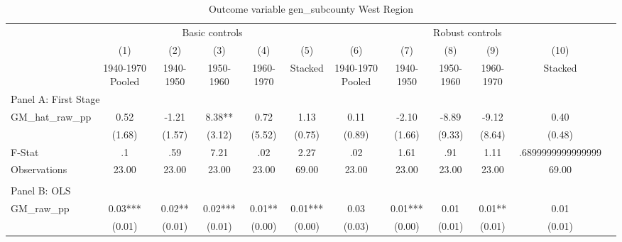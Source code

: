  \begin{table}[htbp]\centering {} \begin{threeparttable} \caption{Outcome variable gen\_subcounty West Region} \begin{tabular}{l*{11}{c}} \toprule
          &\multicolumn{5}{c}{Basic controls}                                   &\multicolumn{5}{c}{Robust controls}                                  \\\cmidrule(lr){2-6}\cmidrule(lr){7-11}
          &\multicolumn{1}{c}{(1)}&\multicolumn{1}{c}{(2)}&\multicolumn{1}{c}{(3)}&\multicolumn{1}{c}{(4)}&\multicolumn{1}{c}{(5)}&\multicolumn{1}{c}{(6)}&\multicolumn{1}{c}{(7)}&\multicolumn{1}{c}{(8)}&\multicolumn{1}{c}{(9)}&\multicolumn{1}{c}{(10)}\\
          &\multicolumn{1}{c}{1940-1970 Pooled}&\multicolumn{1}{c}{1940-1950}&\multicolumn{1}{c}{1950-1960}&\multicolumn{1}{c}{1960-1970}&\multicolumn{1}{c}{Stacked}&\multicolumn{1}{c}{1940-1970 Pooled}&\multicolumn{1}{c}{1940-1950}&\multicolumn{1}{c}{1950-1960}&\multicolumn{1}{c}{1960-1970}&\multicolumn{1}{c}{Stacked}\\
\cmidrule(lr){1-11}
\multicolumn{10}{l}{Panel A: First Stage}\\
\cmidrule(lr){1-11}
GM\_hat\_raw\_pp&      0.52   &     -1.21   &      8.38** &      0.72   &      1.13   &      0.11   &     -2.10   &     -8.89   &     -9.12   &      0.40   \\
          &    (1.68)   &    (1.57)   &    (3.12)   &    (5.52)   &    (0.75)   &    (0.89)   &    (1.66)   &    (9.33)   &    (8.64)   &    (0.48)   \\
\midrule
F-Stat    &        .1   &       .59   &      7.21   &       .02   &      2.27   &       .02   &      1.61   &       .91   &      1.11   &.6899999999999999   \\
Observations&     23.00   &     23.00   &     23.00   &     23.00   &     69.00   &     23.00   &     23.00   &     23.00   &     23.00   &     69.00   \\
\cmidrule[\heavyrulewidth](lr){1-11} \\ \cmidrule[\heavyrulewidth](lr){1-11}
\multicolumn{10}{l}{Panel B: OLS}\\
\cmidrule(lr){1-11}
GM\_raw\_pp &      0.03***&      0.02** &      0.02***&      0.01** &      0.01***&      0.03   &      0.01***&      0.01   &      0.01** &      0.01   \\
          &    (0.01)   &    (0.01)   &    (0.01)   &    (0.00)   &    (0.00)   &    (0.03)   &    (0.00)   &    (0.01)   &    (0.01)   &    (0.01)   \\

\end{tabular}
\end{threeparttable}
\end{table}
